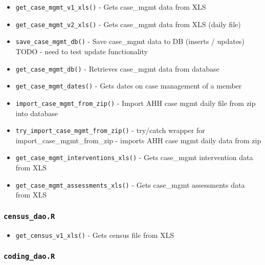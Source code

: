 \documentclass[
]{book}
\providecommand{\tightlist}{%
  \setlength{\itemsep}{0pt}\setlength{\parskip}{0pt}}
\begin{document}
\begin{itemize}
\tightlist
\item
  \texttt{get\_case\_mgmt\_v1\_xls()} - Gets case\_mgmt data from XLS
\item
  \texttt{get\_case\_mgmt\_v2\_xls()} - Gets case\_mgmt data from XLS (daily file)
\item
  \texttt{save\_case\_mgmt\_db()} - Save case\_mgmt data to DB (inserts / updates) TODO - need to test update functionality
\item
  \texttt{get\_case\_mgmt\_db()} - Retrieves case\_mgmt data from database
\item
  \texttt{get\_case\_mgmt\_dates()} - Gets dates on case management of a member
\item
  \texttt{import\_case\_mgmt\_from\_zip()} - Import AHH case mgmt daily file from zip into database
\item
  \texttt{try\_import\_case\_mgmt\_from\_zip()} - try/catch wrapper for import\_case\_mgmt\_from\_zip - imports AHH case mgmt daily data from zip
\item
  \texttt{get\_case\_mgmt\_interventions\_xls()} - Gets case\_mgmt intervention data from XLS
\item
  \texttt{get\_case\_mgmt\_assessments\_xls()} - Gets case\_mgmt assessments data from XLS
\end{itemize}

\hypertarget{census_dao.r}{%
\subsubsection{\texorpdfstring{\texttt{census\_dao.R}}{census\_dao.R}}\label{census_dao.r}}

\begin{itemize}
\tightlist
\item
  \texttt{get\_census\_v1\_xls()} - Gets census file from XLS
\end{itemize}

\hypertarget{coding_dao.r}{%
\subsubsection{\texorpdfstring{\texttt{coding\_dao.R}}{coding\_dao.R}}\label{coding_dao.r}}
\end{document}
